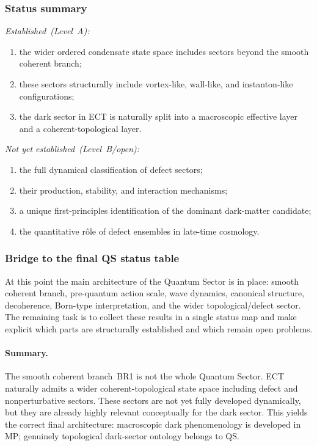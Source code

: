 \documentclass[11pt,a4paper]{article}
\numberwithin{equation}{section}
\begin{document}
\subsubsection*{Status summary}

\textit{Established~(Level~A):}
\begin{enumerate}[label=(\roman*)]
  \item the wider ordered condensate state space includes sectors beyond
    the smooth coherent branch;
  \item these sectors structurally include vortex-like, wall-like, and
    instanton-like configurations;
  \item the dark sector in ECT is naturally split into a macroscopic
    effective layer and a coherent-topological layer.
\end{enumerate}

\textit{Not yet established~(Level~B/open):}
\begin{enumerate}[label=(\roman*)]
  \item the full dynamical classification of defect sectors;
  \item their production, stability, and interaction mechanisms;
  \item a unique first-principles identification of the dominant
    dark-matter candidate;
  \item the quantitative r\^ole of defect ensembles in late-time
    cosmology.
\end{enumerate}

\subsubsection*{Bridge to the final QS status table}

At this point the main architecture of the Quantum Sector is in place:
smooth coherent branch, pre-quantum action scale, wave dynamics,
canonical structure, decoherence, Born-type interpretation, and the
wider topological/defect sector.
The remaining task is to collect these results in a single status map
and make explicit which parts are structurally established and which
remain open problems.

\paragraph{Summary.}
The smooth coherent branch~BR1 is not the whole Quantum Sector.
ECT naturally admits a wider coherent-topological state space
including defect and nonperturbative sectors.
These sectors are not yet fully developed dynamically, but they are
already highly relevant conceptually for the dark sector.
This yields the correct final architecture: macroscopic dark
phenomenology is developed in MP; genuinely topological dark-sector
ontology belongs to QS.
\end{document}
